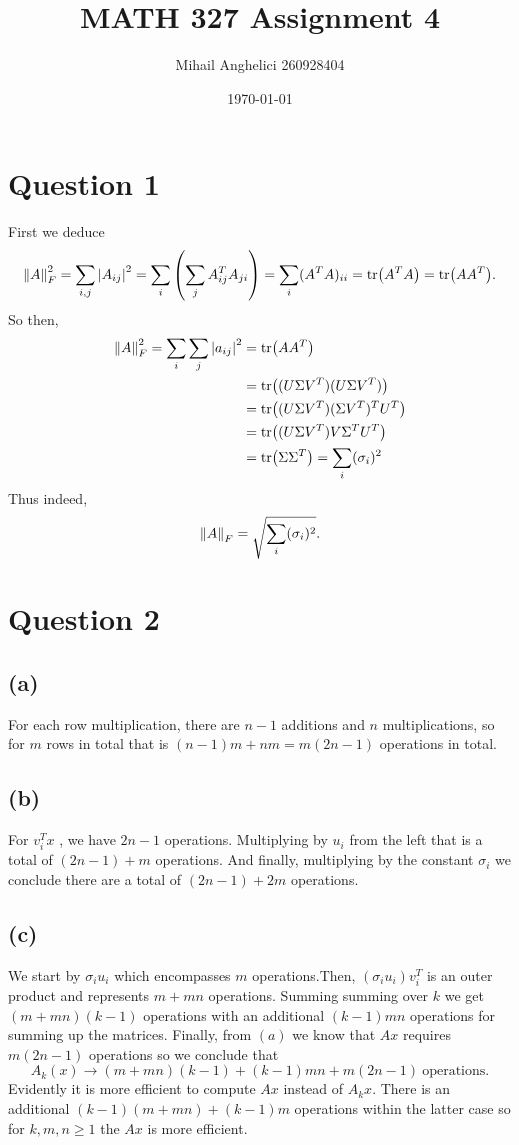 \documentclass[12pt]{article}
\title{MATH 327 Assignment 4}
\author{Mihail Anghelici 260928404 }
\date{\today}
\begin{document}
	\maketitle
	\section*{Question 1}
	First we deduce 
	$$ \norm{A}_F^{2} = \sum_{i,j} \abs{A_{ij}}^{2} = \sum_i \left(\sum_j A_{ij}^{T} A_{ji}\right) = \sum_i (A^{T}A)_{ii} = \tr(A^{T}A) = \tr(AA^{T}).$$
	So then,
			\begin{align*}
				\norm{A}_F^{2} = \sum_i \sum_j \abs{a_{ij}}^{2} &= \tr(A A^{T}) \\ 
				&=\tr((U \Sigma V^{T} )(U \Sigma V^{T})) \\
				&=\tr((U \Sigma V^{T})(\Sigma V^{T})^{T} U^{T}) \\
				&=\tr((U \Sigma V^{T})V \Sigma^{T} U^{T}) \\
				&=\tr (\Sigma \Sigma^{T}) = \sum_i (\sigma_i)^{2}
			\end{align*}
			Thus indeed, 
			$$ \norm{A}_F = \sqrt{\sum_i(\sigma_i)^{2}}.$$
	\section*{Question 2}
		\subsection*{(a)}	
			For each row multiplication, there are $n-1$ additions and $n$ multiplications, so for $m$ rows in total that is $(n-1)m + nm = m(2n-1)$ operations in total.
			
		\subsection*{(b)}
			For $v_{i}^{T} x$ , we have $2n-1$ operations. Multiplying by $u_{i}$ from the left that is a total of $(2n -1)+m$ operations. And finally, multiplying by the constant $\sigma_i$ we conclude there are a total of $(2n-1)+2m$ operations.
			
		\subsection*{(c)}
		We start by $\sigma_i u_i$ which encompasses $m$ operations.Then,	$(\sigma_i u_i) v_i^{T}$ is an outer product and represents $m+mn$ operations. Summing summing over $k$ we get $(m+mn)(k-1)$ operations with an additional $(k-1)mn$ operations for summing up the matrices. Finally, from $(a)$ we know that $Ax$ requires $m(2n-1)$ operations so we conclude that 
			$$ A_k (x) \to (m+mn)(k-1) +(k-1)mn +m(2n-1)  \ \text{operations.}$$
		Evidently it is more efficient to compute $Ax$ instead of $A_k x$. There is an additional $(k-1)(m+mn) +(k-1)m$ operations within the latter case so for $k,m,n \ge 1$ the $Ax$ is more efficient.
\end{document}
